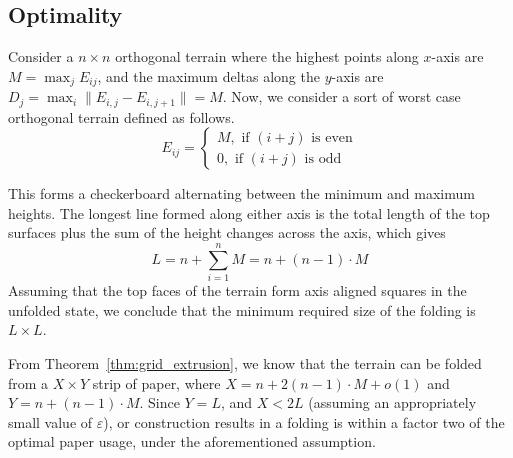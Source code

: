 \subsection{Optimality}
\label{sec:optimality}

Consider a $n\times n$ orthogonal terrain where the highest points along $x$-axis are $M = \max_j E_{ij}$,
and the maximum deltas along the $y$-axis are $D_j = \max_i{\|E_{i,j}-E_{i,j+1}\|} = M$.
Now, we consider a sort of worst case orthogonal terrain defined as follows.
$$
E_{ij}=
\begin{cases}
M, \textrm{ if $(i+j)$ is even}\\
0, \textrm{ if $(i+j)$ is odd}
\end{cases}
$$

This forms a checkerboard alternating between the minimum and maximum heights.
The longest line formed along either axis is the total length of the top surfaces plus the sum of the height changes across the axis, which gives
$$L = n + \sum^{n}_{i=1} M = n + (n-1)\cdot M$$
Assuming that the top faces of the terrain form axis aligned squares in the unfolded state,
we conclude that the minimum required size of the folding is $L\times L$.

From Theorem~\ref{thm:grid_extrusion}, we know that the terrain can be folded from a $X\times Y$ strip of paper,
where $X = n + 2(n-1)\cdot M + o(1)$ and $Y = n + (n-1)\cdot M$.
Since $Y = L$, and $X < 2L$ (assuming an appropriately small value of $\varepsilon$),
or construction results in a folding is within a factor two of the optimal paper usage, under the aforementioned assumption.




